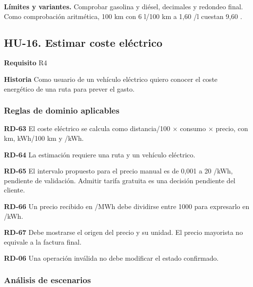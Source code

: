 {\fontsize{9}{11.8}\selectfont\textbf{Límites y variantes.} Comprobar gasolina y diésel, decimales y redondeo final. Como comprobación aritmética, 100 km con 6 l/100 km a 1,60 \texteuro{}/l cuestan 9,60 \texteuro{}.\par}\vspace{4pt}
\clearpage\subsection*{HU-16. Estimar coste eléctrico}

\textbf{Requisito} R4\par

\textbf{Historia} Como usuario de un vehículo eléctrico quiero conocer el coste energético de una ruta para prever el gasto.\par

\subsubsection*{Reglas de dominio aplicables}

\textbf{RD-63} El coste eléctrico se calcula como distancia/100 \(\times\) consumo \(\times\) precio, con km, kWh/100 km y \texteuro{}/kWh.\par

\textbf{RD-64} La estimación requiere una ruta y un vehículo eléctrico.\par

\textbf{RD-65} El intervalo propuesto para el precio manual es de 0,001 a 20 \texteuro{}/kWh, pendiente de validación. Admitir tarifa gratuita es una decisión pendiente del cliente.\par

\textbf{RD-66} Un precio recibido en \texteuro{}/MWh debe dividirse entre 1000 para expresarlo en \texteuro{}/kWh.\par

\textbf{RD-67} Debe mostrarse el origen del precio y su unidad. El precio mayorista no equivale a la factura final.\par

\textbf{RD-06} Una operación inválida no debe modificar el estado confirmado.\par

\subsubsection*{Análisis de escenarios}

